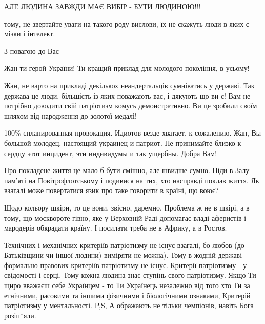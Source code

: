\begin{itemize}
АЛЕ ЛЮДИНА ЗАВЖДИ МАЄ ВИБІР - БУТИ ЛЮДИНОЮ!!!

тому, не звертайте уваги на такого роду вислови, їх не скажуть люди в яких є мізки і інтелект.

З повагою до Вас🤗


Жан ти герой України! Ти кращий приклад для молодого покоління, в усьому!


Жан, не варто на прикладі декількох неандертальців сумніватись у державі. Так
держава це люди, більшість із яких поважають вас, і дякують що ви є! Вам не
потрібно доводити свій патріотизм комусь демонстративно. Ви це зробили своїм
шляхом від народження до золотої медалі!


100\% спланированная провокация. Идиотов везде хватает, к сожалению. Жан, Вы
большой молодец, настоящий украинец и патриот. Не принимайте близко к сердцу
этот инцидент, эти индивидумы и так ущербны. Добра Вам!


Про покладене життя це мало б бути смішно, але швидше сумно. Піди в Залу
пам'яті на Повітрофлотському і подивися на тих, хто насправді поклав життя. Як
взагалі може повертатися язик про таке говорити в країні, що воює?

Щодо кольору шкіри, то це вони, звісно, даремно. Проблема ж не в шкірі, а в
тому, що москвороте гівно, яке у Верховній Раді допомагає владі аферистів і
мародерів обкрадати країну. І посилати треба не в Африку, а в Ростов.


Технічних і механічних критеріїв патріотизму не існує взагалі, бо любов (до
Батьківщини чи іншої людини) виміряти не можна). Тому в жодній державі
формально-правових критеріїв патріотизму не існує. Критерії патріотизму - у
свідомості і серці. Тому кожна людина знає ступінь свого патріотизму. Якщо Ти
щиро вважаєш себе Українцем - то Ти Українець незалежно від того хто Ти за
етнічними, расовими та іншими фізичними і біологічними ознаками, Критерій
патріотизму у ментальності. P,S, А ображають не тільки чемпіонів, навіть Бога
розіп*яли.


\end{itemize}
